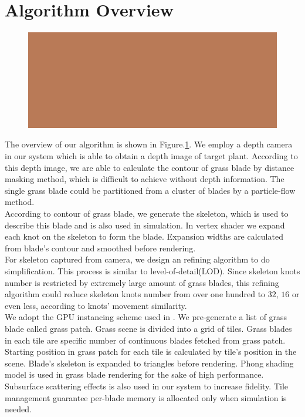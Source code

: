 \documentclass[10pt,journal,compsoc]{IEEEtran}
\begin{document}
\section{Algorithm Overview}


\begin{figure}
    \centering
    \includegraphics[width=1.0\textwidth]{figs/test.jpg}
    \label{fig:overview}
\end{figure}

The overview of our algorithm is shown in Figure.\ref{fig:overview}. We employ a depth camera in our system which is able to obtain a depth image of target plant. According to this depth image, we are able to calculate the contour of grass blade by distance masking method, which is difficult to achieve without depth information. The single grass blade could be partitioned from a cluster of blades by a particle-flow method\cite{neubert2007approximate}.\\

According to contour of grass blade, we generate the skeleton, which is used to describe this blade and is also used in simulation. In vertex shader we expand each knot on the skeleton to form the blade. Expansion widths are calculated from blade's contour and smoothed before rendering.\\

For skeleton captured from camera, we design an refining algorithm to do simplification. This process is similar to level-of-detail(LOD). Since skeleton knots number is restricted by extremely large amount of grass blades, this refining algorithm could reduce skeleton knots number from over one hundred to $32$, $16$ or even less, according to knots' movement similarity.\\

We adopt the GPU instancing scheme used in \cite{fan2015simulation}. We pre-generate a list of grass blade called grass patch. Grass scene is divided into a grid of tiles. Grass blades in each tile are specific number of continuous blades fetched from grass patch. Starting position in grass patch for each tile is calculated by tile's position in the scene. Blade's skeleton is expanded to triangles before rendering. Phong shading model is used in grass blade rendering for the sake of high performance. Subsurface scattering effects is also used in our system to increase fidelity\cite{sousa2007vegetation}. Tile management guarantee per-blade memory is allocated only when simulation is needed.  \\
\end{document}
